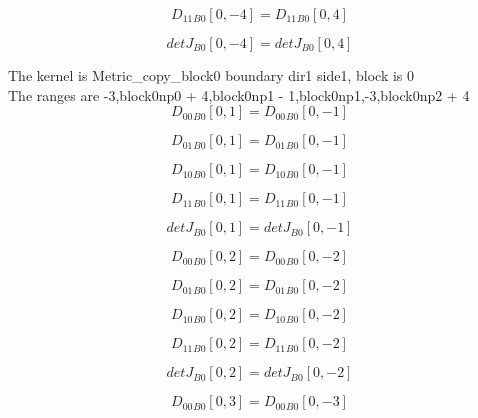 \documentclass{article}
\begin{document}
\begin{dmath}{D_{11}{_{B0}}}[{0,-4}] = {D_{11}{_{B0}}}[{0,4}]\end{dmath}

\begin{dmath}{detJ{_{B0}}}[{0,-4}] = {detJ{_{B0}}}[{0,4}]\end{dmath}

\noindent The kernel is Metric_copy_block0 boundary dir1 side1, block is 0\\\noindent The ranges are -3,block0np0 + 4,block0np1 - 1,block0np1,-3,block0np2 + 4\\\begin{dmath}{D_{00}{_{B0}}}[{0,1}] = {D_{00}{_{B0}}}[{0,-1}]\end{dmath}

\begin{dmath}{D_{01}{_{B0}}}[{0,1}] = {D_{01}{_{B0}}}[{0,-1}]\end{dmath}

\begin{dmath}{D_{10}{_{B0}}}[{0,1}] = {D_{10}{_{B0}}}[{0,-1}]\end{dmath}

\begin{dmath}{D_{11}{_{B0}}}[{0,1}] = {D_{11}{_{B0}}}[{0,-1}]\end{dmath}

\begin{dmath}{detJ{_{B0}}}[{0,1}] = {detJ{_{B0}}}[{0,-1}]\end{dmath}

\begin{dmath}{D_{00}{_{B0}}}[{0,2}] = {D_{00}{_{B0}}}[{0,-2}]\end{dmath}

\begin{dmath}{D_{01}{_{B0}}}[{0,2}] = {D_{01}{_{B0}}}[{0,-2}]\end{dmath}

\begin{dmath}{D_{10}{_{B0}}}[{0,2}] = {D_{10}{_{B0}}}[{0,-2}]\end{dmath}

\begin{dmath}{D_{11}{_{B0}}}[{0,2}] = {D_{11}{_{B0}}}[{0,-2}]\end{dmath}

\begin{dmath}{detJ{_{B0}}}[{0,2}] = {detJ{_{B0}}}[{0,-2}]\end{dmath}

\begin{dmath}{D_{00}{_{B0}}}[{0,3}] = {D_{00}{_{B0}}}[{0,-3}]\end{dmath}
\end{document}
